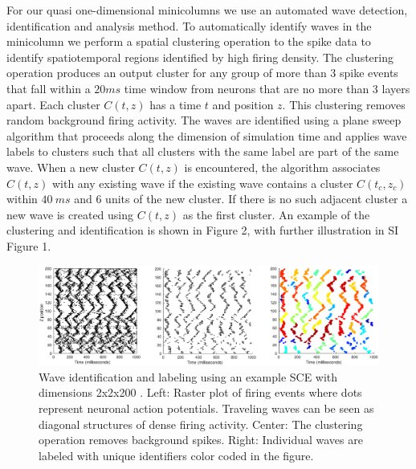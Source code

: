 For our quasi one-dimensional minicolumns we use an automated wave detection, identification and analysis method.
To automatically identify waves in the minicolumn we perform a spatial clustering operation to the spike data to identify spatiotemporal regions identified by high firing density. 
The clustering operation produces an output cluster for any group of more than $3$ spike events that fall within a $20ms$ time window from neurons that are no more than $3$ layers apart.
Each cluster $C(t,z)$ has a time $t$ and position $z$.
This clustering removes random background firing activity. 
The waves are identified using a plane sweep algorithm that proceeds along the dimension of simulation time and applies wave labels to clusters such that all clusters with the same label are part of the same wave.
When a new cluster $C(t,z)$ is encountered, the algorithm associates $C(t,z)$ with any existing wave if the existing wave contains a cluster $C(t_c,z_c)$ within $40~ms$ and $6$ units of the new cluster.
If there is no such adjacent cluster a new wave is created using $C(t,z)$ as the first cluster.
An example of the clustering and identification is shown in Figure 2, with further illustration in SI Figure 1.

\begin{figure}[!htb]
  \centering
  \includegraphics[width=\textwidth]{fig/DetectorExample}
  \caption{Wave identification and labeling using an example SCE with dimensions 2x2x200 . Left: Raster plot of firing events where dots represent neuronal action potentials. 
	Traveling waves can be seen as diagonal structures of dense firing activity. 
	Center: The clustering operation removes background spikes. 
	Right: Individual waves are labeled with unique identifiers color coded in the figure.}
  \label{fig:wave_analysis}
\end{figure}
\FloatBarrier

